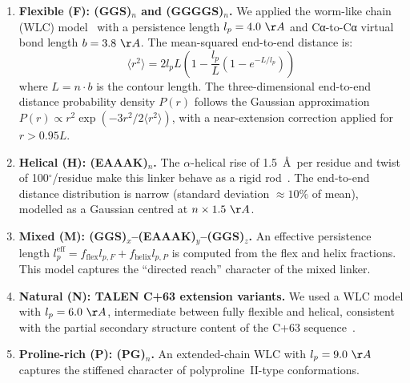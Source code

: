 \documentclass[11pt,a4paper]{article}
\newcommand{\angstrom}{\AA}
\begin{document}
\begin{enumerate}
  \item \textbf{Flexible (F): (GGS)$_n$ and (GGGGS)$_n$.} We applied the worm-like
    chain (WLC) model~\citep{Kratky1949,Marko1995} with a persistence length
    $l_p = 4.0~\angstrom$ and Cα-to-Cα virtual bond length $b = 3.8~\angstrom$.
    The mean-squared end-to-end distance is:
    \begin{equation}
      \langle r^2 \rangle = 2 l_p L \left(1 - \frac{l_p}{L}\left(1 - e^{-L/l_p}\right)\right)
      \label{eq:wlc}
    \end{equation}
    where $L = n \cdot b$ is the contour length. The three-dimensional end-to-end
    distance probability density $P(r)$ follows the Gaussian approximation
    $P(r) \propto r^2 \exp(-3r^2/2\langle r^2 \rangle)$, with a near-extension
    correction applied for $r > 0.95L$.

  \item \textbf{Helical (H): (EAAAK)$_n$.} The $\alpha$-helical rise of 1.5~\angstrom\
    per residue and twist of 100$^{\circ}$/residue make this linker behave as a
    rigid rod~\citep{Arai2001}. The end-to-end distance distribution is narrow
    (standard deviation $\approx 10\%$ of mean), modelled as a Gaussian centred
    at $n \times 1.5~\angstrom$.

  \item \textbf{Mixed (M): (GGS)$_x$--(EAAAK)$_y$--(GGS)$_z$.} An effective
    persistence length $l_p^\mathrm{eff} = f_\mathrm{flex} l_{p,F} + f_\mathrm{helix} l_{p,P}$
    is computed from the flex and helix fractions. This model captures the
    ``directed reach'' character of the mixed linker.

  \item \textbf{Natural (N): TALEN C+63 extension variants.} We used a WLC model
    with $l_p = 6.0~\angstrom$, intermediate between fully flexible and helical,
    consistent with the partial secondary structure content of the C+63 sequence~\citep{Miller2011}.

  \item \textbf{Proline-rich (P): (PG)$_n$.} An extended-chain WLC with $l_p = 9.0~\angstrom$
    captures the stiffened character of polyproline~II-type conformations.
\end{enumerate}
\end{document}
